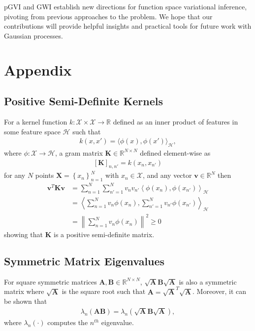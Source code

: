 \documentclass{article}
\numberwithin{equation}{section}
\begin{document}
pGVI and GWI establish new directions for function space variational inference, pivoting from previous approaches to the problem. 
We hope that our contributions will provide helpful insights and practical tools for future work with Gaussian processes.


\newpage



\newpage
\appendix
{}
\section{Appendix}

\subsection{Positive Semi-Definite Kernels} \label{appendix:positive-definite-kernel}
For a kernel function $k: \mathcal{X} \times \mathcal{X} \rightarrow \mathbb{R}$ defined as an inner product of features in some feature space $\mathcal{H}$ such that
\begin{align}
    k(x, x') = \langle \phi(x), \phi(x') \rangle_{\mathcal{H}},
\end{align}
where $\phi: \mathcal{X} \rightarrow \mathcal{H}$, a gram matrix $\mathbf{K} \in \mathbb{R}^{N\times N}$ defined element-wise as
\begin{align}
    \left[\mathbf{K}\right]_{n, n'} = k(x_n, x_{n'})
\end{align}
for any $N$ points $\mathbf{X} = \left\{x_n\right\}_{n=1}^N$ with $x_n \in \mathcal{X}$, and any vector $\mathbf{v} \in \mathbb{R}^N$ then
\begin{align}
    \mathbf{v}^T \mathbf{K} \mathbf{v} &= \sum_{n=1}^N\sum_{n'=1}^N v_n v_{n'}  \left\langle \phi(x_n), \phi(x_{n'}) \right\rangle_{\mathcal{H}} \\
    &= \left\langle\sum_{n=1}^N v_n \phi(x_n), \sum_{n'=1}^N  v_{n'}\phi(x_{n'}) \right\rangle_{\mathcal{H}} \\
    &= \left\| \sum_{n=1}^N v_n \phi(x_n) \right\|^2 \geq 0
\end{align}
showing that $\mathbf{K}$ is a positive semi-definite matrix.

\newpage
\subsection{Symmetric Matrix Eigenvalues}\label{appendix:eigenvalue-symmetric-matrix}
For square symmetric matrices $\mathbf{A}, \mathbf{B} \in \mathbb{R}^{N \times N}$, $\sqrt{\mathbf{A}}\mathbf{B}\sqrt{\mathbf{A}}$ is also a symmetric matrix where $\sqrt{\mathbf{A}}$ is the square root such that $\mathbf{A} = \sqrt{\mathbf{A}}^T \sqrt{\mathbf{A}}$. Moreover, it can be shown that
\begin{align}
    \lambda_{n} \left(\mathbf{A} \mathbf{B}\right) = \lambda_{n} \left(\sqrt{\mathbf{A}}\mathbf{B}\sqrt{\mathbf{A}}\right),
\end{align}
where $\lambda_{n}(\cdot)$ computes the $n^{th}$ eigenvalue.
\end{document}
